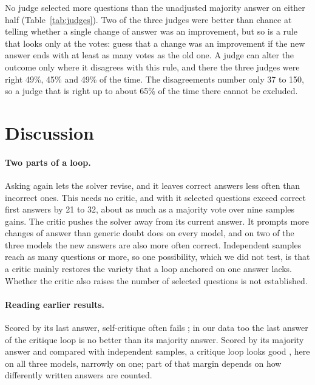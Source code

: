 \documentclass[11pt]{article}
\begin{document}
No judge selected more questions than the unadjusted majority answer on either half (Table~\ref{tab:judges}).
Two of the three judges were better than chance at telling whether a single change of answer was an improvement, but so is a rule that looks only at the votes: guess that a change was an improvement if the new answer ends with at least as many votes as the old one.
A judge can alter the outcome only where it disagrees with this rule, and there the three judges were right 49\%, 45\% and 49\% of the time.
The disagreements number only 37 to 150, so a judge that is right up to about 65\% of the time there cannot be excluded.

\section{Discussion}

\paragraph{Two parts of a loop.}
Asking again lets the solver revise, and it leaves correct answers less often than incorrect ones.
This needs no critic, and with it selected questions exceed correct first answers by 21 to 32, about as much as a majority vote over nine samples gains.
The critic pushes the solver away from its current answer.
It prompts more changes of answer than generic doubt does on every model, and on two of the three models the new answers are also more often correct.
Independent samples reach as many questions or more, so one possibility, which we did not test, is that a critic mainly restores the variety that a loop anchored on one answer lacks.
Whether the critic also raises the number of selected questions is not established.

\paragraph{Reading earlier results.}
Scored by its last answer, self-critique often fails \citep{huang2024cannot,stechly2024selfverification}; in our data too the last answer of the critique loop is no better than its majority answer.
Scored by its majority answer and compared with independent samples, a critique loop looks good \citep{bilal2026refining}, here on all three models, narrowly on one; part of that margin depends on how differently written answers are counted.
\end{document}
